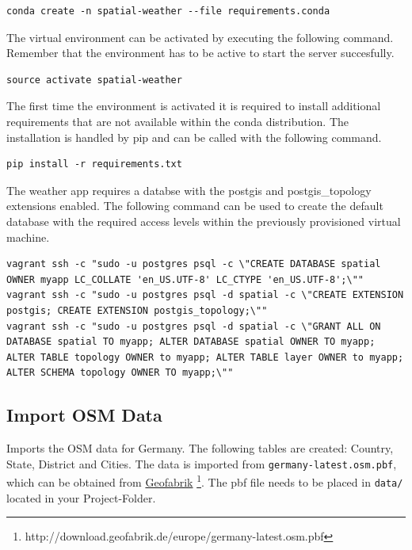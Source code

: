 \documentclass[paper=a4, fontsize=11pt]{article} %
\numberwithin{equation}{section} %
\numberwithin{figure}{section} %
\numberwithin{table}{section} %
\begin{document}
\begin{lstlisting}
conda create -n spatial-weather --file requirements.conda
\end{lstlisting}

The virtual environment can be activated by executing the following command.
Remember that the environment has to be active to start the server succesfully.
\begin{lstlisting}
source activate spatial-weather
\end{lstlisting}

The first time the environment is activated it is required to install additional
requirements that are not available within the conda distribution. The installation
is handled by pip and can be called with the following command.
\begin{lstlisting}
pip install -r requirements.txt
\end{lstlisting}

The weather app requires a databse with the postgis and postgis\_topology extensions enabled.
The following command can be used to create the default database with the required
access levels within the previously provisioned virtual machine.
\begin{lstlisting}[breaklines=true]
vagrant ssh -c "sudo -u postgres psql -c \"CREATE DATABASE spatial OWNER myapp LC_COLLATE 'en_US.UTF-8' LC_CTYPE 'en_US.UTF-8';\""
vagrant ssh -c "sudo -u postgres psql -d spatial -c \"CREATE EXTENSION postgis; CREATE EXTENSION postgis_topology;\""
vagrant ssh -c "sudo -u postgres psql -d spatial -c \"GRANT ALL ON DATABASE spatial TO myapp; ALTER DATABASE spatial OWNER TO myapp; ALTER TABLE topology OWNER to myapp; ALTER TABLE layer OWNER to myapp; ALTER SCHEMA topology OWNER TO myapp;\""
\end{lstlisting}

\subsection{Import OSM Data}\label{import-osm-data}

Imports the OSM data for Germany. The following tables are created: Country, State, District and Cities. The data is imported from \texttt{germany-latest.osm.pbf}, which can be obtained from \href{http://download.geofabrik.de/europe/germany-latest.osm.pbf}{Geofabrik} \footnote{http://download.geofabrik.de/europe/germany-latest.osm.pbf}. The pbf file needs to be placed in \texttt{data/} located in your Project-Folder.
\end{document}
